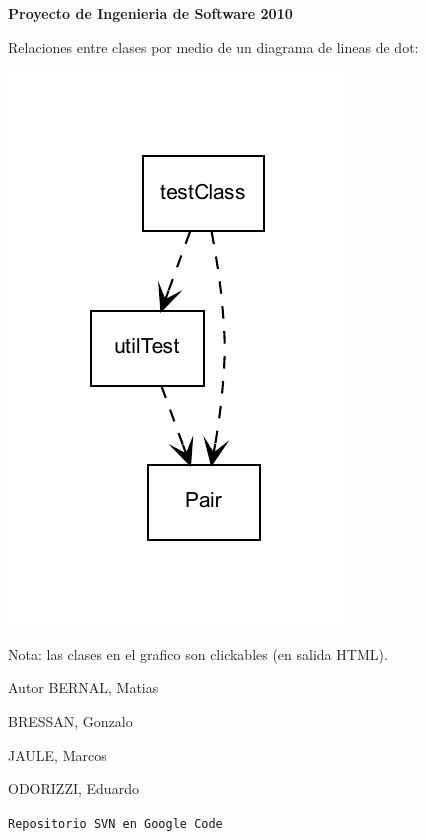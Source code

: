 \begin{center}{\bfseries Proyecto de Ingenieria de Software 2010}\end{center}  \par


Relaciones entre clases por medio de un diagrama de lineas de dot: \begin{center}

\begin{DoxyImageNoCaption}
  \mbox{\includegraphics[width=\textwidth]{inline_dotgraph_1}}
\end{DoxyImageNoCaption}
\end{center}
 Nota: las clases en el grafico son clickables (en salida HTML).

\begin{DoxyAuthor}{Autor}
BERNAL, Matias\par
 BRESSAN, Gonzalo\par
 JAULE, Marcos\par
 ODORIZZI, Eduardo
\end{DoxyAuthor}
\par
 \begin{center} \end{center}  \par
 {\tt Repositorio SVN en Google Code} 
